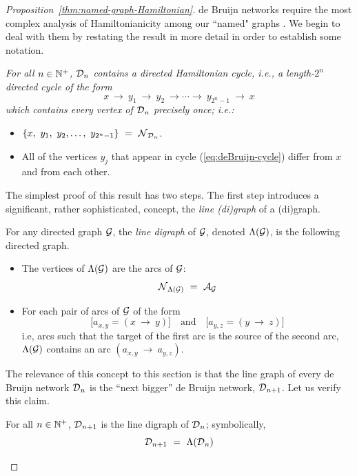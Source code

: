 \begin{proof}[Proposition~\ref{thm:named-graph-Hamiltonian}]
de Bruijn networks require the most complex analysis of Hamiltonianicity among our  ``named" graphs .  We begin to deal with them by restating the result in more detail in order to establish some notation.

\medskip

\noindent
{\em
For all $n \in \mathbb{N}^+$, $\mbox{$\cal D$}_n$ contains a {\em directed Hamiltonian cycle}, i.e., a length-$2^n$ 
directed cycle of the form
\begin{equation}
\label{eq:deBruijn-cycle}
 x \ \rightarrow \ y_1 \ \rightarrow \ y_2 \ \rightarrow \cdots  \rightarrow \ y_{2^n-1} \ \rightarrow \ x
\end{equation}
which contains every vertex of $\mbox{$\cal D$}_n$ precisely once; i.e.:
\begin{itemize}
\item
$\{x, \ y_1, \ y_2, \ldots, \ y_{2^n-1}\} \ = \ \n_{\fd_n}$.
\item
All of the vertices $y_j$ that appear in cycle (\ref{eq:deBruijn-cycle}) differ from $x$ and from each other.
\end{itemize}
}

The simplest proof of this result has two steps.  The first step introduces a significant, rather
sophisticated, concept, the {\it line (di)graph} of a (di)graph.

\bigskip

 

For any directed graph $\mbox{$\cal G$}$, the {\it line digraph} of $\mbox{$\cal G$}$, denoted $\Lambda(\mbox{$\cal G$})$, is the following directed graph.
\begin{itemize}
\item
The vertices of $\Lambda(\mbox{$\cal G$})$ are the arcs of $\mbox{$\cal G$}$:
\[ \n_{{\Lambda}({\cal G})} \ = \ \a_{\fg} \]

\item
For each pair of arcs of $\mbox{$\cal G$}$ of the form
\[ \big[a_{x,y} = (x \ \rightarrow \ y) \big] \ \ \ \mbox{ and } \ \ \ 
\big[a_{y,z} = (y \ \rightarrow \ z) \big]
\]
i.e, arcs such that the target of the first arc is the source of the second arc, $\Lambda(\mbox{$\cal G$})$ contains an arc $(a_{x,y} \ \rightarrow \ a_{y,z})$.
\end{itemize}
The relevance of this concept to this section is that the line graph of every de Bruijn network $\mbox{$\cal D$}_n$ is the ``next bigger'' de Bruijn network, $\mbox{$\cal D$}_{n+1}$.  Let us verify this claim.

\begin{lemma}
\label{thm:deBruin-linegraph}
For all $n \in \mathbb{N}^+$, $\mbox{$\cal D$}_{n+1}$ is the line digraph of $\mbox{$\cal D$}_n$; symbolically,
\[ \mbox{$\cal D$}_{n+1} \ = \ \Lambda(\mbox{$\cal D$}_n) \]
\end{lemma}


\end{proof}
